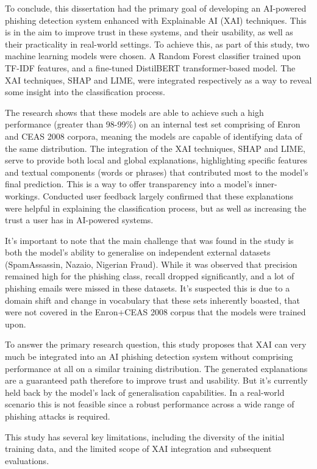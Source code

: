 
To conclude, this dissertation had the primary goal of developing an AI-powered phishing detection system enhanced with Explainable AI (XAI) techniques. This is in the aim to improve trust in these systems, and their usability, as well as their practicality in real-world settings. To achieve this, as part of this study, two machine learning models were chosen. A Random Forest classifier trained upon TF-IDF features, and a fine-tuned DistilBERT transformer-based model. The XAI techniques, SHAP and LIME, were integrated respectively as a way to reveal some insight into the classification process.\newline

\noindent The research shows that these models are able to achieve such a high performance (greater than 98-99\%) on an internal test set comprising of Enron and CEAS 2008 corpora, meaning the models are capable of identifying data of the same distribution. The integration of the XAI techniques, SHAP and LIME, serve to provide both local and global explanations, highlighting specific features and textual components (words or phrases) that contributed most to the model's final prediction. This is a way to offer transparency into a model's inner-workings. Conducted user feedback largely confirmed that these explanations were helpful in explaining the classification process, but as well as increasing the trust a user has in AI-powered systems.\newline

\noindent It's important to note that the main challenge that was found in the study is both the model's ability to generalise on independent external datasets (SpamAssassin, Nazaio, Nigerian Fraud). While it was observed that precision remained high for the phishing class, recall dropped significantly, and a lot of phishing emails were missed in these datasets. It's suspected this is due to a domain shift and change in vocabulary that these sets inherently boasted, that were not covered in the Enron+CEAS 2008 corpus that the models were trained upon.\newline

\noindent To answer the primary research question, this study proposes that XAI can very much be integrated into an AI phishing detection system without comprising performance at all on a similar training distribution. The generated explanations are a guaranteed path therefore to improve trust and usability. But it's currently held back by the model's lack of generalisation capabilities. In a real-world scenario this is not feasible since a robust performance across a wide range of phishing attacks is required.\newline

\noindent This study has several key limitations, including the diversity of the initial training data, and the limited scope of XAI integration and subsequent evaluations.
